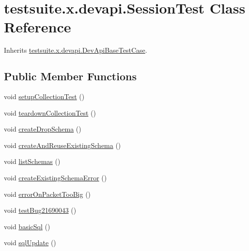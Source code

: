 \hypertarget{classtestsuite_1_1x_1_1devapi_1_1_session_test}{}\section{testsuite.\+x.\+devapi.\+Session\+Test Class Reference}
\label{classtestsuite_1_1x_1_1devapi_1_1_session_test}


Inherits \mbox{\hyperlink{classtestsuite_1_1x_1_1devapi_1_1_dev_api_base_test_case}{testsuite.\+x.\+devapi.\+Dev\+Api\+Base\+Test\+Case}}.

\subsection*{Public Member Functions}
\begin{DoxyCompactItemize}
\item 
void \mbox{\hyperlink{classtestsuite_1_1x_1_1devapi_1_1_session_test_a85145a0b3215643d2fb344eb9bc37d2d}{setup\+Collection\+Test}} ()
\item 
void \mbox{\hyperlink{classtestsuite_1_1x_1_1devapi_1_1_session_test_a9c0c683b3042fb53123c360b76cef62e}{teardown\+Collection\+Test}} ()
\item 
void \mbox{\hyperlink{classtestsuite_1_1x_1_1devapi_1_1_session_test_a39b14a2de73d19f99f150480040c31c5}{create\+Drop\+Schema}} ()
\item 
void \mbox{\hyperlink{classtestsuite_1_1x_1_1devapi_1_1_session_test_a86f3f9ee309faba5c7fcd471fb828550}{create\+And\+Reuse\+Existing\+Schema}} ()
\item 
void \mbox{\hyperlink{classtestsuite_1_1x_1_1devapi_1_1_session_test_afc0d9ee6ae02e55d05e9a241ff362e6d}{list\+Schemas}} ()
\item 
void \mbox{\hyperlink{classtestsuite_1_1x_1_1devapi_1_1_session_test_a73edaeff96b813c2f2ac89bb1fe51a0b}{create\+Existing\+Schema\+Error}} ()
\item 
void \mbox{\hyperlink{classtestsuite_1_1x_1_1devapi_1_1_session_test_a206da8616c724f03c86c7d51b63b793f}{error\+On\+Packet\+Too\+Big}} ()
\item 
void \mbox{\hyperlink{classtestsuite_1_1x_1_1devapi_1_1_session_test_a6ebdd3c58a18e1b8b58788a16c7b4b46}{test\+Bug21690043}} ()
\item 
void \mbox{\hyperlink{classtestsuite_1_1x_1_1devapi_1_1_session_test_a01badad6c403d0997ca67aa9edfc4c35}{basic\+Sql}} ()
\item 
void \mbox{\hyperlink{classtestsuite_1_1x_1_1devapi_1_1_session_test_a1abc724920fb0ef09e727e0cb58e8dd8}{sql\+Update}} ()

\end{DoxyCompactItemize}
